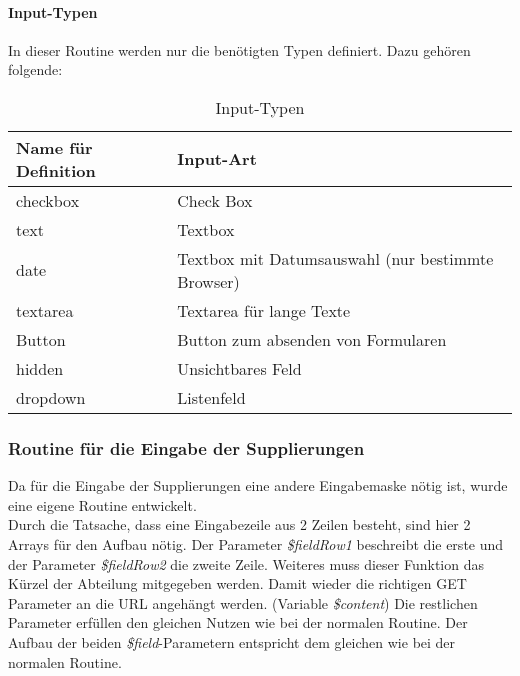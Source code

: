\paragraph{Input-Typen} \label{sec:content_imple_input_type}
In dieser Routine werden nur die benötigten Typen definiert. Dazu gehören folgende:
\begin{table}[H]
\centering
\begin{tabular}{p{4.5 cm}p{10.5 cm}}
   \toprule
   \textbf{Name für Definition} & \textbf{Input-Art} \\
   \midrule
          checkbox & Check Box  \\
          \hline
          text & Textbox \\
          \hline
          date & Textbox mit Datumsauswahl (nur bestimmte Browser) \\
          \hline
          textarea & Textarea für lange Texte\\
          \hline
          Button & Button zum absenden von Formularen\\
          \hline
          hidden & Unsichtbares Feld \\
          \hline
          dropdown & Listenfeld \\
   \bottomrule
\end{tabular}
\caption{Input-Typen}
\end{table}
\subsubsection{Routine für die Eingabe der Supplierungen}
Da für die Eingabe der Supplierungen eine andere Eingabemaske nötig ist, wurde eine eigene Routine entwickelt.\\
Durch die Tatsache, dass eine Eingabezeile aus 2 Zeilen besteht, sind hier 2 Arrays für den Aufbau nötig. Der Parameter \textit{\$fieldRow1} beschreibt die erste und der Parameter \textit{\$fieldRow2} die zweite Zeile. Weiteres muss dieser Funktion das Kürzel der Abteilung mitgegeben werden. Damit wieder die richtigen GET Parameter an die URL angehängt werden. (Variable \textit{\$content}) Die restlichen Parameter erfüllen den gleichen Nutzen wie bei der normalen Routine. Der Aufbau der beiden \textit{\$field}-Parametern entspricht dem gleichen wie bei der normalen Routine.\\

